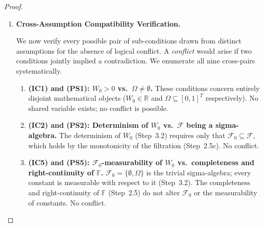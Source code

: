 \documentclass[12pt,openany]{book}
\newcommand{\calF}{\mathcal{F}}
\numberwithin{equation}{chapter}
\theoremstyle{plain}
\theoremstyle{definition}
\theoremstyle{remark}
\numberwithin{equation}{chapter}
\theoremstyle{plain}
\begin{document}
\begin{proof}
\begin{enumerate}[label=\textbf{Phase~\Roman*.}]
\begin{enumerate}[label=\textbf{Step~4.\arabic*.}]
  \item \textbf{Condition \textbf{(BC5)}: Stability of $K$.}
        $K$ is defined as a fixed constant at initialisation
        ($t = 0$) and does not change over $\mathcal{T}$.  No
        mechanism in the canonical model alters $K$ post-initialisation.
        \hfill\checkmark

\end{enumerate}

All sub-conditions \textbf{(BC1)}--\textbf{(BC5)} are satisfied.

\item \textbf{Cross-Assumption Compatibility Verification.}

We now verify every possible pair of sub-conditions drawn from
distinct assumptions for the absence of logical conflict.  A
\emph{conflict} would arise if two conditions jointly implied a
contradiction.  We enumerate all nine cross-pairs systematically.

\begin{enumerate}[label=\textbf{Step~5.\arabic*.}]

  \item \textbf{(IC1) and (PS1): $W_0 > 0$ vs.\
        $\Omega \neq \emptyset$.}
        These conditions concern entirely disjoint mathematical
        objects ($W_0 \in \mathbb{R}$ and $\Omega \subseteq [0,1]^T$
        respectively).  No shared variable exists; no conflict is
        possible.
        \hfill\checkmark

  \item \textbf{(IC2) and (PS2): Determinism of $W_0$ vs.\
        $\calF$ being a sigma-algebra.}
        The determinism of $W_0$ (Step~3.2) requires only that
        $\calF_0 \subseteq \calF$, which holds by the monotonicity
        of the filtration (Step~2.5c).  No conflict.
        \hfill\checkmark

  \item \textbf{(IC5) and (PS5): $\calF_0$-measurability of $W_0$
        vs.\ completeness and right-continuity of $\mathbb{F}$.}
        $\calF_0 = \{\emptyset, \Omega\}$ is the trivial sigma-algebra;
        every constant is measurable with respect to it (Step~3.2).
        The completeness and right-continuity of $\mathbb{F}$
        (Step~2.5) do not alter $\calF_0$ or the measurability of
        constants.  No conflict.
        \hfill\checkmark


\end{enumerate}
\end{enumerate}
\end{proof}
\end{document}
